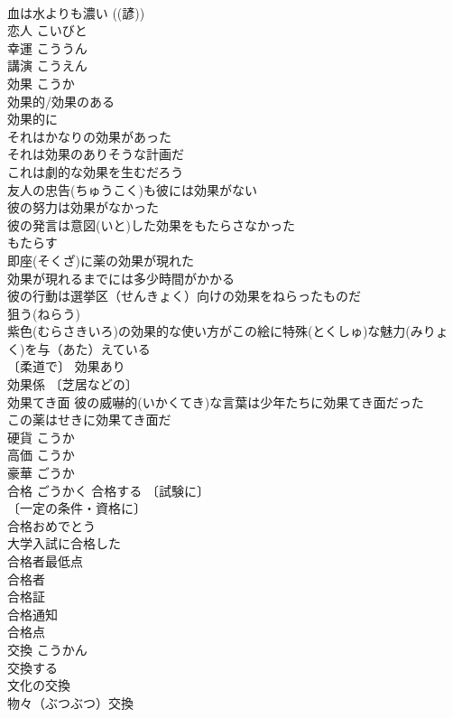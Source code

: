 \documentclass[8pt]{extreport}
\begin{document}
\begin{CJK}{UTF8}{min}
\\	血は水よりも濃い ((諺)) 
\\	恋人	こいびと	
\\	幸運	こううん	
\\	講演	こうえん	
\\	効果	こうか	
\\	効果的/効果のある 
\\	効果的に 
\\	それはかなりの効果があった 
\\	それは効果のありそうな計画だ 
\\	これは劇的な効果を生むだろう 
\\	友人の忠告(ちゅうこく)も彼には効果がない 
\\	彼の努力は効果がなかった 
\\	彼の発言は意図(いと)した効果をもたらさなかった 
\\	もたらす　
\\	即座(そくざ)に薬の効果が現れた 
\\	効果が現れるまでには多少時間がかかる 
\\	彼の行動は選挙区（せんきょく）向けの効果をねらったものだ 
\\	狙う(ねらう)　
\\	紫色(むらさきいろ)の効果的な使い方がこの絵に特殊(とくしゅ)な魅力(みりょく)を与（あた）えている 
\\	〔柔道で〕 効果あり 
\\	効果係 〔芝居などの〕
\\	効果てき面 彼の威嚇的(いかくてき)な言葉は少年たちに効果てき面だった 
\\	この薬はせきに効果てき面だ 
\\	硬貨	こうか	
\\	高価	こうか	
\\	豪華	ごうか	
\\	合格	ごうかく	合格する 〔試験に〕
\\	〔一定の条件・資格に〕
\\	合格おめでとう 
\\	大学入試に合格した 
\\	合格者最低点 
\\	合格者 
\\	合格証 
\\	合格通知 
\\	合格点 
\\	交換	こうかん	
\\	交換する 
\\	文化の交換 
\\	物々（ぶつぶつ）交換 

\end{CJK}
\end{document}
